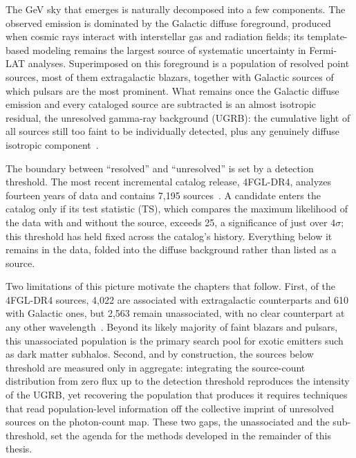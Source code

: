 The GeV sky that emerges is naturally decomposed into a few components. The observed emission is dominated by the Galactic diffuse foreground, produced when cosmic rays interact with interstellar gas and radiation fields; its template-based modeling remains the largest source of systematic uncertainty in Fermi-LAT analyses. Superimposed on this foreground is a population of resolved point sources, most of them extragalactic blazars, together with Galactic sources of which pulsars are the most prominent. What remains once the Galactic diffuse emission and every cataloged source are subtracted is an almost isotropic residual, the unresolved gamma-ray background (UGRB): the cumulative light of all sources still too faint to be individually detected, plus any genuinely diffuse isotropic component~\cite{Fermi-LAT:2014ryh}.

The boundary between ``resolved'' and ``unresolved'' is set by a detection threshold. The most recent incremental catalog release, 4FGL-DR4, analyzes fourteen years of data and contains 7,195 sources~\cite{Ballet:2023qzs}. A candidate enters the catalog only if its test statistic (TS), which compares the maximum likelihood of the data with and without the source, exceeds 25, a significance of just over $4\sigma$; this threshold has held fixed across the catalog's history. Everything below it remains in the data, folded into the diffuse background rather than listed as a source.

Two limitations of this picture motivate the chapters that follow. First, of the 4FGL-DR4 sources, 4,022 are associated with extragalactic counterparts and 610 with Galactic ones, but 2,563 remain unassociated, with no clear counterpart at any other wavelength~\cite{Ballet:2023qzs}. Beyond its likely majority of faint blazars and pulsars, this unassociated population is the primary search pool for exotic emitters such as dark matter subhalos. Second, and by construction, the sources below threshold are measured only in aggregate: integrating the source-count distribution from zero flux up to the detection threshold reproduces the intensity of the UGRB, yet recovering the population that produces it requires techniques that read population-level information off the collective imprint of unresolved sources on the photon-count map. These two gaps, the unassociated and the sub-threshold, set the agenda for the methods developed in the remainder of this thesis.

